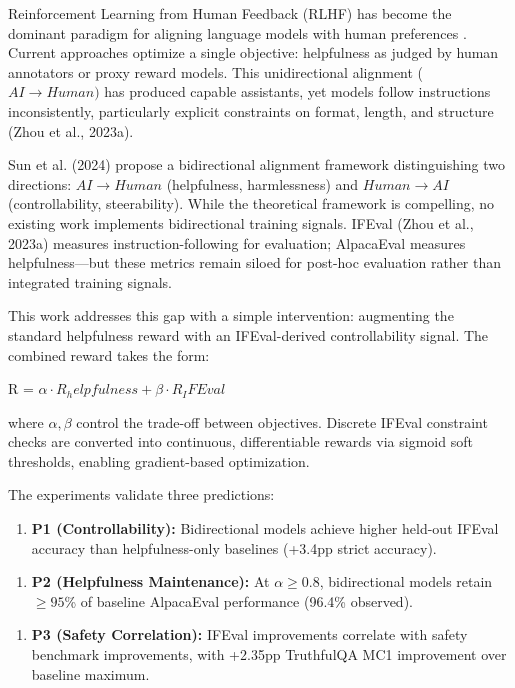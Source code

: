 
Reinforcement Learning from Human Feedback (RLHF) has become the dominant paradigm for aligning language models with human preferences \citep{ouyang2022instructgpt}. Current approaches optimize a single objective: helpfulness as judged by human annotators or proxy reward models. This unidirectional alignment ($AI\rightarrow Human)$ has produced capable assistants, yet models follow instructions inconsistently, particularly explicit constraints on format, length, and structure (Zhou et al., 2023a).

Sun et al. (2024) propose a bidirectional alignment framework distinguishing two directions: $AI\rightarrow Human$ (helpfulness, harmlessness) and $Human\rightarrow AI$ (controllability, steerability). While the theoretical framework is compelling, no existing work implements bidirectional training signals. IFEval (Zhou et al., 2023a) measures instruction-following for evaluation; AlpacaEval \citep{dubois2024alpacaeval} measures helpfulness---but these metrics remain siloed for post-hoc evaluation rather than integrated training signals.

This work addresses this gap with a simple intervention: augmenting the standard helpfulness reward with an IFEval-derived controllability signal. The combined reward takes the form:

R = $\alpha \cdot R_helpfulness + \beta \cdot R_IFEval$

where $\alpha, \beta$ control the trade-off between objectives. Discrete IFEval constraint checks are converted into continuous, differentiable rewards via sigmoid soft thresholds, enabling gradient-based optimization.

The experiments validate three predictions:

\begin{enumerate}
\item \textbf{P1 (Controllability):} Bidirectional models achieve higher held-out IFEval accuracy than helpfulness-only baselines (+3.4pp strict accuracy).
\end{enumerate}

\begin{enumerate}
\item \textbf{P2 (Helpfulness Maintenance):} At $\alpha \geq 0.8$, bidirectional models retain $\geq 95$\% of baseline AlpacaEval performance (96.4\% observed).
\end{enumerate}

\begin{enumerate}
\item \textbf{P3 (Safety Correlation):} IFEval improvements correlate with safety benchmark improvements, with +2.35pp TruthfulQA MC1 improvement over baseline maximum.
\end{enumerate}

